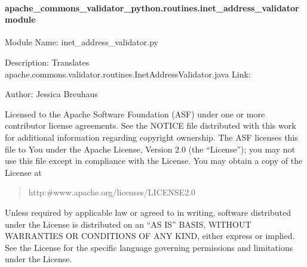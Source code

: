 \documentclass[letterpaper,10pt,english]{sphinxmanual}
\begin{document}
\paragraph{apache\_commons\_validator\_python.routines.inet\_address\_validator module}
\label{\detokenize{apache_commons_validator_python.routines:module-apache_commons_validator_python.routines.inet_address_validator}}\label{\detokenize{apache_commons_validator_python.routines:apache-commons-validator-python-routines-inet-address-validator-module}}
\sphinxAtStartPar
Module Name: inet\_address\_validator.py

\sphinxAtStartPar
Description: Translates apache.commons.validator.routines.InetAddressValidator.java
Link: 

\sphinxAtStartPar
Author: Jessica Breuhaus
\begin{description}
\sphinxAtStartPar
Licensed to the Apache Software Foundation (ASF) under one or more
contributor license agreements.  See the NOTICE file distributed with
this work for additional information regarding copyright ownership.
The ASF licenses this file to You under the Apache License, Version 2.0
(the “License”); you may not use this file except in compliance with
the License.  You may obtain a copy of the License at
\begin{quote}

\sphinxAtStartPar
http:\#www.apache.org/licenses/LICENSE\sphinxhyphen{}2.0
\end{quote}

\sphinxAtStartPar
Unless required by applicable law or agreed to in writing, software
distributed under the License is distributed on an “AS IS” BASIS,
WITHOUT WARRANTIES OR CONDITIONS OF ANY KIND, either express or implied.
See the License for the specific language governing permissions and
limitations under the License.

\end{description}
\end{document}
